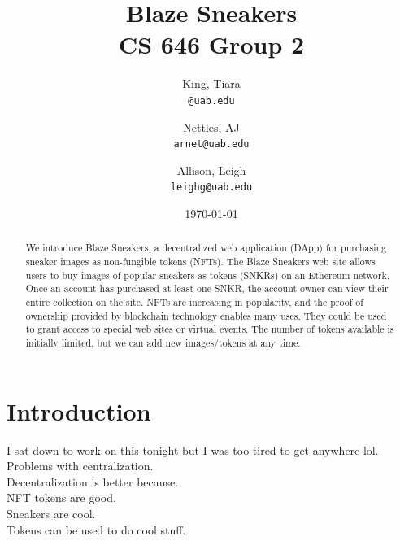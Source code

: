 \documentclass{article}
\begin{document}
\title{Blaze Sneakers\\CS 646 Group 2}
\date{\today}

\author{
  King, Tiara\\
  \texttt{@uab.edu}
  \and
  Nettles, AJ\\
  \texttt{arnet@uab.edu}
  \and
  Allison, Leigh\\
  \texttt{leighg@uab.edu}
}
\maketitle

\begin{abstract}
\noindent
    We introduce Blaze Sneakers, a decentralized web application (DApp) for purchasing sneaker images as non-fungible tokens (NFTs).
    The Blaze Sneakers web site allows users to buy images of popular sneakers as tokens (SNKRs) on an Ethereum network.
    Once an account has purchased at least one SNKR, the account owner can view their entire collection on the site.
    NFTs are increasing in popularity, and the proof of ownership provided by blockchain technology enables many uses.
    They could be used to grant access to special web sites or virtual events.
    The number of tokens available is initially limited, but we can add new images/tokens at any time.
\end{abstract}


\section{Introduction}
    I sat down to work on this tonight but I was too tired to get anywhere lol.
    Problems with centralization.\\
    Decentralization is better because.\\
    NFT tokens are good.\\
    Sneakers are cool.\\
    Tokens can be used to do cool stuff.
\end{document}
